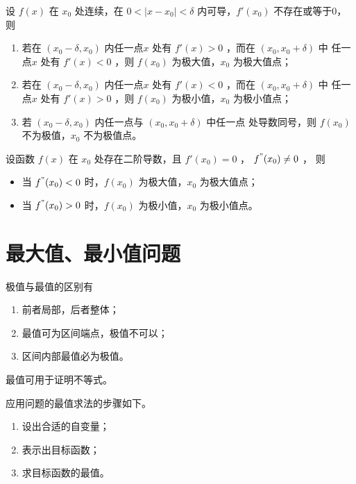 \begin{Theo}[极值第一充分条件]

    设 $ f(x) $ 在 $ x_0 $ 处连续，在 $ 0<|x-x_0|<\delta $ 内可导，$ f'(x_0) $ 不存在或等于0，则
    \begin{enumerate}
        \item 若在 $ (x_0-\delta,x_0) $ 内任一点$ x $ 处有 $ f'(x)>0 $ ，而在 $ (x_0,x_0+\delta) $ 中
        任一点$ x $ 处有 $ f'(x)<0 $ ，则 $ f(x_0) $ 为极大值，$ x_0 $ 为极大值点；
        \item 若在 $ (x_0-\delta,x_0) $ 内任一点$ x $ 处有 $ f'(x)<0 $ ，而在 $ (x_0,x_0+\delta) $ 中
        任一点$ x $ 处有 $ f'(x)>0 $ ，则 $ f(x_0) $ 为极小值，$ x_0 $ 为极小值点；
        \item 若 $ (x_0-\delta,x_0) $ 内任一点与 $ (x_0,x_0+\delta) $ 中任一点
        处导数同号，则 $ f(x_0) $ 不为极值，$ x_0 $ 不为极值点。
    \end{enumerate}
\end{Theo}

\begin{Theo}[极值第二充分条件]

    设函数 $ f(x) $ 在 $ x_0 $ 处存在二阶导数，且 $ f'(x_0)=0 $ ， $ f^"(x_0)\neq 0 $ ，
    则\begin{itemize}
        \item 当 $ f^"(x_0)<0 $ 时，$ f(x_0) $ 为极大值，$ x_0 $ 为极大值点；
        \item 当 $ f^"(x_0)>0 $ 时，$ f(x_0) $ 为极小值，$ x_0 $ 为极小值点。
    \end{itemize}
\end{Theo}

\section{最大值、最小值问题}

极值与最值的区别有\begin{enumerate}
    \item 前者局部，后者整体；
    \item 最值可为区间端点，极值不可以；
    \item 区间内部最值必为极值。
\end{enumerate}

最值可用于证明不等式。

应用问题的最值求法的步骤如下。
\begin{enumerate}
    \item 设出合适的自变量；
    \item 表示出目标函数；
    \item 求目标函数的最值。
\end{enumerate}

